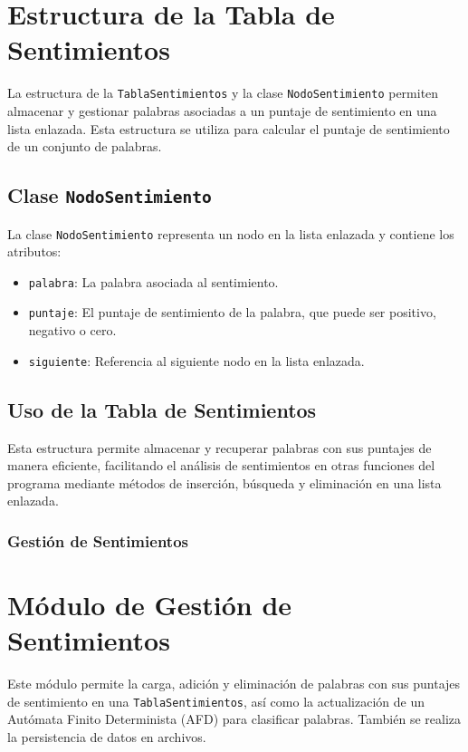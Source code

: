 \documentclass[12pt,a4paper]{article}
\begin{document}
\section*{Estructura de la Tabla de Sentimientos}

La estructura de la \texttt{TablaSentimientos} y la clase \texttt{NodoSentimiento} permiten
almacenar y gestionar palabras asociadas a un puntaje de sentimiento en una lista enlazada.
Esta estructura se utiliza para calcular el puntaje de sentimiento de un conjunto de palabras.

\subsection*{Clase \texttt{NodoSentimiento}}
La clase \texttt{NodoSentimiento} representa un nodo en la lista enlazada y contiene los atributos:
\begin{itemize}
	\item \texttt{palabra}: La palabra asociada al sentimiento.
	\item \texttt{puntaje}: El puntaje de sentimiento de la palabra, que puede ser positivo, negativo o cero.
	\item \texttt{siguiente}: Referencia al siguiente nodo en la lista enlazada.
\end{itemize}

\subsection*{Uso de la Tabla de Sentimientos}
Esta estructura permite almacenar y recuperar palabras con sus puntajes de manera eficiente,
facilitando el análisis de sentimientos en otras funciones del programa mediante métodos de
inserción, búsqueda y eliminación en una lista enlazada.

\subsubsection{Gestión de Sentimientos}

\section*{Módulo de Gestión de Sentimientos}

Este módulo permite la carga, adición y eliminación de palabras con sus puntajes de sentimiento
en una \texttt{TablaSentimientos}, así como la actualización de un Autómata Finito Determinista
(AFD) para clasificar palabras. También se realiza la persistencia de datos en archivos.
\end{document}
